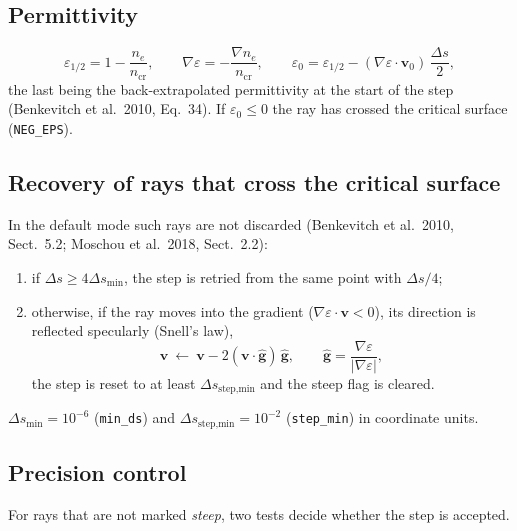 \documentclass[11pt,a4paper]{article}
\newcommand{\code}[1]{\texttt{#1}}
\newcommand{\vect}[1]{\bm{#1}}
\newcommand{\ncr}{n_\mathrm{cr}}
\begin{document}
\subsection{Permittivity}
\begin{equation}
  \varepsilon_{1/2}=1-\frac{n_e}{\ncr},\qquad
  \nabla\varepsilon=-\frac{\nabla n_e}{\ncr},\qquad
  \varepsilon_0=\varepsilon_{1/2}-(\nabla\varepsilon\cdot\vect v_0)\,\frac{\Delta s}{2},
  \label{eq:eps0}
\end{equation}
the last being the back-extrapolated permittivity at the start of the step (Benkevitch et al.\
2010, Eq.~34). If $\varepsilon_0\le0$ the ray has crossed the critical surface (\code{NEG\_EPS}).

\subsection{Recovery of rays that cross the critical surface}
In the default mode such rays are not discarded (Benkevitch et al.\ 2010, Sect.~5.2; Moschou et
al.\ 2018, Sect.~2.2):
\begin{enumerate}
  \item if $\Delta s\ge4\Delta s_\text{min}$, the step is retried from the same point with
        $\Delta s/4$;
  \item otherwise, if the ray moves into the gradient ($\nabla\varepsilon\cdot\vect v<0$), its direction
        is reflected specularly (Snell's law),
        \begin{equation}
          \vect v\ \leftarrow\ \vect v-2(\vect v\cdot\hat{\vect g})\,\hat{\vect g},\qquad
          \hat{\vect g}=\frac{\nabla\varepsilon}{|\nabla\varepsilon|},
        \end{equation}
        the step is reset to at least $\Delta s_\text{step,min}$ and the steep flag is cleared.
\end{enumerate}
$\Delta s_\text{min}=10^{-6}$ (\code{min\_ds}) and $\Delta s_\text{step,min}=10^{-2}$
(\code{step\_min}) in coordinate units.

\subsection{Precision control}\label{sec:check}
For rays that are not marked \emph{steep}, two tests decide whether the step is accepted.
\end{document}
